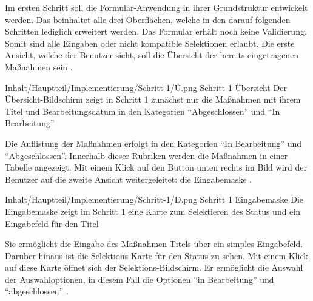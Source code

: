Im ersten Schritt soll die Formular-Anwendung in ihrer Grundstruktur entwickelt werden.
 Das beinhaltet alle drei Oberflächen, welche in den darauf folgenden Schritten lediglich erweitert werden.  Das Formular erhält noch keine  Validierung. Somit sind alle Eingaben oder nicht kompatible Selektionen erlaubt. Die erste Ansicht, welche der Benutzer sieht, soll die Übersicht der bereits eingetragenen Maßnahmen sein \Abb{\ref{fig:Schritt1Uebersicht}}.
 
\begin{alexfigure}{Inhalt/Hauptteil/Implementierung/Schritt-1/Ü.png}
  {Schritt 1 Übersicht}
  {Der Übersicht-Bildschirm zeigt in  Schritt 1 zunächst nur die Maßnahmen mit ihrem Titel und Bearbeitungsdatum in den Kategorien \enquote{Abgeschlossen} und \enquote{In Bearbeitung}}

  \label{fig:Schritt1Uebersicht}

\end{alexfigure}

Die Auflistung der Maßnahmen erfolgt in den Kategorien \enquote{In Bearbeitung} und \enquote{Abgeschlossen}.
Innerhalb dieser Rubriken werden die Maßnahmen in einer Tabelle angezeigt.
Mit einem Klick auf den Button unten rechts im Bild wird der Benutzer auf die zweite Ansicht weitergeleitet: die Eingabemaske \Abb{\ref{fig:Schritt1Eingabemaske}}.

\begin{alexfigure}{Inhalt/Hauptteil/Implementierung/Schritt-1/D.png}
  {Schritt 1 Eingabemaske}
  {Die Eingabemaske zeigt im Schritt 1 eine Karte zum Selektieren des Status und ein Eingabefeld für den Titel}

  \label{fig:Schritt1Eingabemaske}

\end{alexfigure}

Sie ermöglicht die Eingabe des Maßnahmen-Titels über ein simples Eingabefeld.
Darüber hinaus ist die Selektions-Karte für den Status zu sehen.
Mit einem Klick auf diese Karte öffnet sich der Selektions-Bildschirm.
Er ermöglicht die Auswahl der Auswahloptionen, in diesem Fall die Optionen \enquote{in Bearbeitung} und \enquote{abgeschlossen}
\Abb{\ref{fig:Schritt1SelektionsBildschirmStatus}}.

